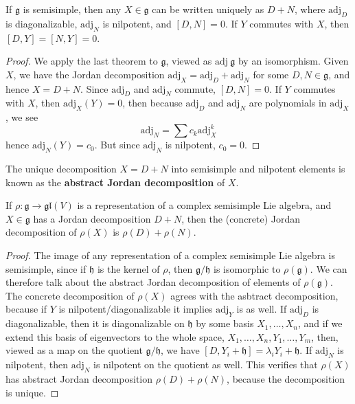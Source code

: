 \begin{theorem}
    If $\mathfrak{g}$ is semisimple, then any $X \in \mathfrak{g}$ can be written uniquely as $D + N$, where $\text{adj}_D$ is diagonalizable, $\text{adj}_N$ is nilpotent, and $[D,N] = 0$. If $Y$ commutes with $X$, then $[D,Y] = [N,Y] = 0$.
\end{theorem}
\begin{proof}
    We apply the last theorem to $\mathfrak{g}$, viewed as $\text{adj}\ \mathfrak{g}$ by an isomorphism. Given $X$, we have the Jordan decomposition $\text{adj}_X = \text{adj}_D + \text{adj}_N$ for some $D,N \in \mathfrak{g}$, and hence $X = D + N$. Since $\text{adj}_D$ and $\text{adj}_N$ commute, $[D,N] = 0$. If $Y$ commutes with $X$, then $\text{adj}_X(Y) = 0$, then because $\text{adj}_D$ and $\text{adj}_N$ are polynomials in $\text{adj}_X$, we see
    \[ \text{adj}_N = \sum c_k \text{adj}^k_X \]
    hence $\text{adj}_N(Y) = c_0$. But since $\text{adj}_N$ is nilpotent, $c_0 = 0$.
\end{proof}

The unique decomposition $X = D + N$ into semisimple and nilpotent elements is known as the {\bf abstract Jordan decomposition} of $X$.

\begin{theorem}
    If $\rho: \mathfrak{g} \to \mathfrak{gl}(V)$ is a representation of a complex semisimple Lie algebra, and $X \in \mathfrak{g}$ has a Jordan decomposition $D + N$, then the (concrete) Jordan decomposition of $\rho(X)$ is $\rho(D) + \rho(N)$.
\end{theorem}
\begin{proof}
    The image of any representation of a complex semisimple Lie algebra is semisimple, since if $\mathfrak{h}$ is the kernel of $\rho$, then $\mathfrak{g}/\mathfrak{h}$ is isomorphic to $\rho(\mathfrak{g})$. We can therefore talk about the abstract Jordan decomposition of elements of $\rho(\mathfrak{g})$. The concrete decomposition of $\rho(X)$ agrees with the asbtract decomposition, because if $Y$ is nilpotent/diagonalizable it implies $\text{adj}_Y$ is as well. If $\text{adj}_D$ is diagonalizable, then it is diagonalizable on $\mathfrak{h}$ by some basis $X_1, \dots, X_n$, and if we extend this basis of eigenvectors to the whole space, $X_1, \dots, X_n, Y_1, \dots, Y_m$, then, viewed as a map on the quotient $\mathfrak{g}/\mathfrak{h}$, we have $[D, Y_i + \mathfrak{h}] = \lambda_i Y_i + \mathfrak{h}$. If $\text{adj}_N$ is nilpotent, then $\text{adj}_N$ is nilpotent on the quotient as well. This verifies that $\rho(X)$ has abstract Jordan decomposition $\rho(D) + \rho(N)$, because the decomposition is unique.
\end{proof}








